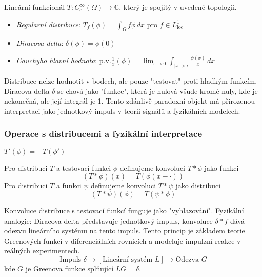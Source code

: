 \begin{definition}[Distribuce]
Lineární funkcionál $T: C_c^\infty(\Omega) \to \mathbb{C}$, který je spojitý v uvedené topologii.
\end{definition}

\begin{example}
\begin{itemize}
\item \emph{Regularní distribuce}: $T_f(\phi) = \int_\Omega f\phi \, dx$ pro $f \in L^1_{\text{loc}}$
\item \emph{Diracova delta}: $\delta(\phi) = \phi(0)$
\item \emph{Cauchyho hlavní hodnota}: $\mathrm{p.v.}\frac{1}{x}(\phi) = \lim_{\epsilon \to 0} \int_{|x|>\epsilon} \frac{\phi(x)}{x} \, dx$
\end{itemize}
\end{example}

\begin{intuition}
Distribuce nelze hodnotit v bodech, ale pouze "testovat" proti hladkým funkcím. Diracova delta $\delta$ se chová jako "funkce", která je nulová všude kromě nuly, kde je nekonečná, ale její integrál je 1. Tento zdánlivě paradoxní objekt má přirozenou interpretaci jako jednotkový impuls v teorii signálů a fyzikálních modelech.
\end{intuition}

\subsubsection{Operace s distribucemi a fyzikální interpretace}

\begin{definition}
$T'(\phi) = -T(\phi')$
\end{definition}

\begin{definition}
Pro distribuci $T$ a testovací funkci $\phi$ definujeme konvoluci $T * \phi$ jako funkci
\[
(T * \phi)(x) = T(\phi(x - \cdot))
\]
Pro distribuci $T$ a funkci $\psi$ definujeme konvoluci $T * \psi$ jako distribuci
\[
(T * \psi)(\phi) = T(\psi * \phi)
\]
\end{definition}

\begin{intuition}
Konvoluce distribuce s testovací funkcí funguje jako "vyhlazování". Fyzikální analogie: Diracova delta představuje jednotkový impuls, konvoluce $\delta * f$ dává odezvu lineárního systému na tento impuls. Tento princip je základem teorie Greenových funkcí v diferenciálních rovnicích a modeluje impulzní reakce v reálných experimentech.
\[
\text{Impuls } \delta \rightarrow [\text{Lineární systém } L] \rightarrow \text{Odezva } G
\]
kde $G$ je Greenova funkce splňující $LG = \delta$.
\end{intuition}

